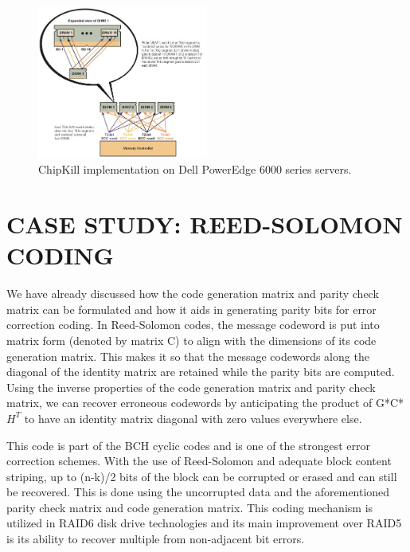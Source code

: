 \documentclass[letterpaper, 10 pt, conference]{ieeeconf}
\begin{document}
\begin{figure}[!ht]
	\centering
	\includegraphics [width=0.5\textwidth] {ChipKill.JPG} 
    \caption{ChipKill implementation on Dell PowerEdge 6000 series servers.\cite{Chipkill}}

\end{figure}

\section{CASE STUDY: REED-SOLOMON CODING}

We have already discussed how the code generation matrix and parity check matrix can be formulated and how it aids in generating parity bits for error correction coding.  \cite{Reed-Solomon} In Reed-Solomon codes, the message codeword is put into matrix form (denoted by matrix C) to align with the dimensions of its code generation matrix.  This makes it so that the message codewords along the diagonal of the identity matrix are retained while the parity bits are computed.  Using the inverse properties of the code generation matrix and parity check matrix, we can recover erroneous codewords by anticipating the product of G*C*$H^T$ to have an identity matrix diagonal with zero values everywhere else.

This code is part of the BCH cyclic codes and is one of the strongest error correction schemes.  With the use of Reed-Solomon and adequate block content striping, up to (n-k)/2 bits of the block can be corrupted or erased and can still be recovered. \cite{Secret Share}  This is done using the uncorrupted data and the aforementioned parity check matrix and code generation matrix.  This coding mechanism is utilized in RAID6 disk drive technologies and its main improvement over RAID5 is its ability to recover multiple from non-adjacent bit errors.



\addtolength{\textheight}{-12cm}   %
\end{document}
